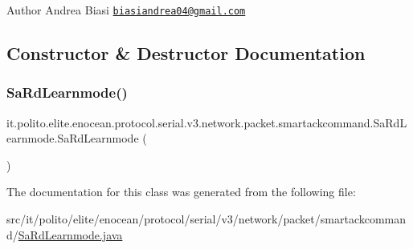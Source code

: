 \begin{DoxyAuthor}{Author}
Andrea Biasi \href{mailto:biasiandrea04@gmail.com}{\tt biasiandrea04@gmail.\+com} 
\end{DoxyAuthor}


\subsection{Constructor \& Destructor Documentation}
\hypertarget{classit_1_1polito_1_1elite_1_1enocean_1_1protocol_1_1serial_1_1v3_1_1network_1_1packet_1_1smartackcommand_1_1_sa_rd_learnmode_aa95d07df306960f0e7fb88f08ed5f98f}{}\label{classit_1_1polito_1_1elite_1_1enocean_1_1protocol_1_1serial_1_1v3_1_1network_1_1packet_1_1smartackcommand_1_1_sa_rd_learnmode_aa95d07df306960f0e7fb88f08ed5f98f} 
\subsubsection{\texorpdfstring{Sa\+Rd\+Learnmode()}{SaRdLearnmode()}}
{\footnotesize\ttfamily it.\+polito.\+elite.\+enocean.\+protocol.\+serial.\+v3.\+network.\+packet.\+smartackcommand.\+Sa\+Rd\+Learnmode.\+Sa\+Rd\+Learnmode (\begin{DoxyParamCaption}{ }\end{DoxyParamCaption})}



The documentation for this class was generated from the following file\+:\begin{DoxyCompactItemize}
\item 
src/it/polito/elite/enocean/protocol/serial/v3/network/packet/smartackcommand/\hyperlink{_sa_rd_learnmode_8java}{Sa\+Rd\+Learnmode.\+java}\end{DoxyCompactItemize}
